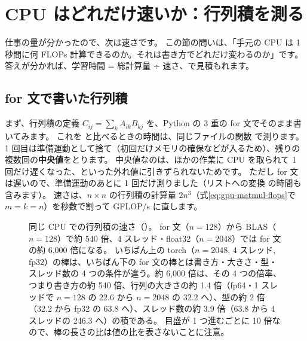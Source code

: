 \section{CPU はどれだけ速いか：行列積を測る}\label{sec:gpu-cpu-speed}

仕事の量が分かったので、次は速さです。
この節の問いは、「手元の CPU は 1 秒間に何 FLOPs 計算できるのか。それは書き方でどれだけ変わるのか」です。
答えが分かれば、学習時間 = 総計算量 ÷ 速さ、で見積もれます。

\subsection*{for 文で書いた行列積}

まず、行列積の定義 $C_{ij}=\sum_k A_{ik}B_{kj}$ を、Python の 3 重の for 文でそのまま書いてみます。
これを  と比べるときの時間は、同じファイルの関数  で測ります。
1 回目は準備運動として捨て（初回だけメモリの確保などが入るため）、残りの複数回の\textbf{中央値}をとります。
中央値なのは、ほかの作業に CPU を取られて 1 回だけ遅くなった、といった外れ値に引きずられないためです。
ただし for 文は遅いので、準備運動のあとに 1 回だけ測りました（リストへの変換  の時間も含みます）。
速さは、$n\times n$ の行列積の計算量 $2n^3$（式\eqref{eq:gpu-matmul-flops}で $m=k=n$）を秒数で割って GFLOP/s に直します。

\begin{figure}[!b]
\centering
{}
\caption{同じ CPU での行列積の速さ（）。
for 文（$n=128$）から BLAS（$n=128$）で約 540 倍、4 スレッド・float32（$n=2048$）では for 文の約 6,000 倍になる。
いちばん上の torch（$n=2048$, 4 スレッド, fp32）の棒は、いちばん下の for 文の棒とは書き方・大きさ・型・スレッド数の 4 つの条件が違う。約 6,000 倍は、その 4 つの倍率、つまり書き方の約 540 倍、行列の大きさの約 1.4 倍（fp64・1 スレッドで $n=128$ の 22.6 から $n=2048$ の 32.2 へ）、型の約 2 倍（32.2 から fp32 の 63.8 へ）、スレッド数の約 3.9 倍（63.8 から 4 スレッドの 246.3 へ）の積である。
目盛が 1 つ進むごとに 10 倍なので、棒の長さの比は値の比を表さないことに注意。}
\label{fig:gpu-loop-blas}
\end{figure}

